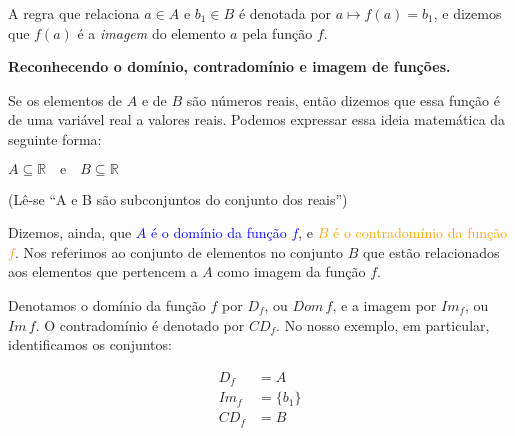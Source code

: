 \documentclass[12pt,openright,twoside,a4paper]{article}
\theoremstyle{definition}
\begin{document}
	A regra que relaciona $a \in A$ e $b_1 \in B$ é denotada por $a \mapsto f(a) = b_1$, e dizemos que $f(a)$ é a \textit{imagem} do elemento $a$ pela função $f$.

	
	\textbf{Reconhecendo o domínio, contradomínio e imagem de funções.}
	
	Se os elementos de $A$ e de $B$ são números reais, então dizemos que essa função é de uma variável real a valores reais. Podemos expressar essa ideia matemática da seguinte forma:
	
	\begin{center}
		$A \subseteq \mathbb{R} \quad \text{e} \quad B \subseteq \mathbb{R}$
		
		(Lê-se ``A e B são subconjuntos do conjunto dos reais'')
	\end{center}

	
	Dizemos, ainda, que \textcolor{blue}{$A$ é o domínio da função $f$}, e \textcolor{orange}{$B$ é o contradomínio da função $f$}. Nos referimos ao conjunto de elementos no conjunto $B$ que estão relacionados aos elementos que pertencem a $A$ como imagem da função $f$.
	
	Denotamos o domínio da função $f$ por $D_f$, ou $Dom\,f$, e a imagem por $Im_f$, ou $Im\,f$. O contradomínio é denotado por $CD_f$. No nosso exemplo, em particular, identificamos os conjuntos:
	
	\begin{align*}
		D_f &= A\\
		Im_f &= \{b_1\}\\
		CD_f &= B
	\end{align*}
	
\end{document}
